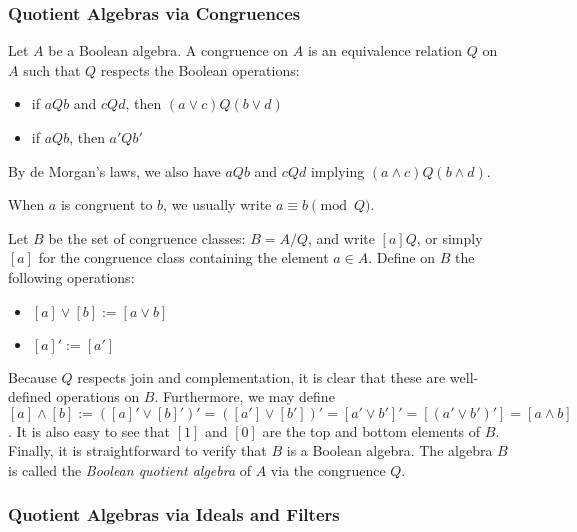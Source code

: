 \documentclass[12pt]{article}
\begin{document}
\subsubsection*{Quotient Algebras via Congruences}

Let $A$ be a Boolean algebra.  A congruence on $A$ is an equivalence relation $Q$ on $A$ such that $Q$ respects the Boolean operations:
\begin{itemize}
\item if $a Q b$ and $c Q d$, then $(a\vee c) Q (b\vee d)$
\item if $a Q b$, then $a' Q b'$
\end{itemize}
By de Morgan's laws, we also have $a Q b$ and $c Q d$ implying $(a\wedge c) Q (b\wedge d)$.

When $a$ is congruent to $b$, we usually write $a\equiv b\pmod{Q}$.

Let $B$ be the set of congruence classes: $B=A/Q$, and write $[a]Q$, or simply $[a]$ for the congruence class containing the element $a\in A$.  Define on $B$ the following operations:
\begin{itemize}
\item $[a]\vee [b]:= [a\vee b]$
\item $[a]':=[a']$
\end{itemize}
Because $Q$ respects join and complementation, it is clear that these are well-defined operations on $B$.  Furthermore, we may define $[a]\wedge [b]:=([a]'\vee [b]')'=([a']\vee [b'])'=[a'\vee b']'=[(a'\vee b')']=[a\wedge b]$.  It is also easy to see that $[1]$ and $[0]$ are the top and bottom elements of $B$.  Finally, it is straightforward to verify that $B$ is a Boolean algebra.  The algebra $B$ is called the \emph{Boolean quotient algebra} of $A$ via the congruence $Q$.

\subsubsection*{Quotient Algebras via Ideals and Filters}
\end{document}
